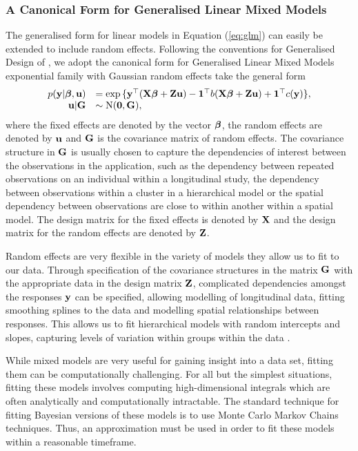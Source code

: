 \subsubsection{A Canonical Form for Generalised Linear Mixed Models}
The generalised form for linear models in Equation (\ref{eq:glm}) can easily be extended to include random
effects.  Following the conventions for Generalised Design of \citep{Zhao2006}, we adopt the canonical form
for Generalised Linear Mixed Models exponential family with Gaussian random effects take the general form
$$
\begin{array}{rl}\label{eq:glmm}
	p({\bf y} | {\boldsymbol \beta}, {\bf u}) &= \exp{\{ {\bf y}^\top ({\bf X}{\boldsymbol\beta}+ {\bf Z}{\bf u}) - {\bf1}^\top b({\bf X}{\boldsymbol\beta}+ {\bf Z}{\bf u}) + {\bf1}^\top c({\bf y}) \}}, \\
	{\bf u} | {\bf G} &\sim \text{N}({\bf 0}, {\bf G}),
\end{array}
$$
where the fixed effects are denoted by the vector ${\boldsymbol \beta}$, the random effects are denoted by ${\bf u}$ and ${\bf G}$
is the covariance matrix of random effects. The covariance structure in ${\bf G}$ is usually chosen to capture the
dependencies of interest between the observations in the application, such as the dependency between repeated
observations on an individual within a longitudinal study, the dependency between observations within a
cluster in a hierarchical model or the spatial dependency between observations are close to within another
within a spatial model. The design matrix for the fixed effects is denoted by ${\bf X}$ and the design matrix for
the random effects are denoted by ${\bf Z}$.

Random effects are very flexible in the variety of models they allow us to fit to our data. Through
specification of the covariance structures in the matrix ${\bf G}$ with the appropriate data in the design matrix
${\bf Z}$, complicated dependencies amongst the responses ${\bf y}$ can be specified, allowing modelling of
longitudinal data, fitting smoothing splines to the data and modelling spatial relationships between
responses. This allows us to fit hierarchical models with random intercepts and slopes, capturing levels of variation within groups within the data \citep{Gelman2007}.

While mixed models are very useful for gaining insight into a data set, fitting them can be computationally
challenging. For all but the simplest situations, fitting these models involves computing high-dimensional
integrals which are often analytically and computationally intractable. The standard technique for fitting
Bayesian versions of these models is to use Monte Carlo Markov Chains techniques. Thus, an approximation must
be used in order to fit these models within a reasonable timeframe.

